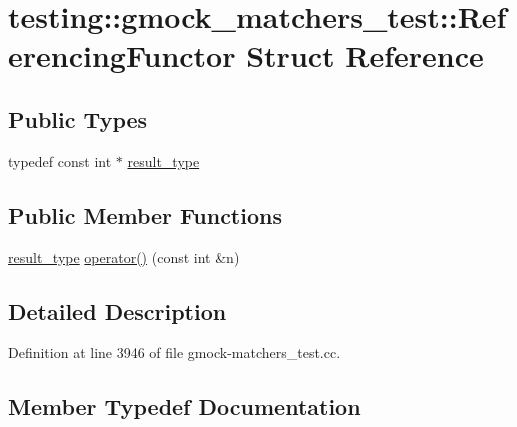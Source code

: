 \hypertarget{structtesting_1_1gmock__matchers__test_1_1_referencing_functor}{}\section{testing\+:\+:gmock\+\_\+matchers\+\_\+test\+:\+:Referencing\+Functor Struct Reference}
\label{structtesting_1_1gmock__matchers__test_1_1_referencing_functor}
\subsection*{Public Types}
\begin{DoxyCompactItemize}
\item 
typedef const int $\ast$ \hyperlink{structtesting_1_1gmock__matchers__test_1_1_referencing_functor_a5856a8175e2f797a6733a363b2834094}{result\+\_\+type}
\end{DoxyCompactItemize}
\subsection*{Public Member Functions}
\begin{DoxyCompactItemize}
\item 
\hyperlink{structtesting_1_1gmock__matchers__test_1_1_referencing_functor_a5856a8175e2f797a6733a363b2834094}{result\+\_\+type} \hyperlink{structtesting_1_1gmock__matchers__test_1_1_referencing_functor_a149f15ed9afbff28f5c3639c0f3eb255}{operator()} (const int \&n)
\end{DoxyCompactItemize}


\subsection{Detailed Description}


Definition at line 3946 of file gmock-\/matchers\+\_\+test.\+cc.



\subsection{Member Typedef Documentation}

